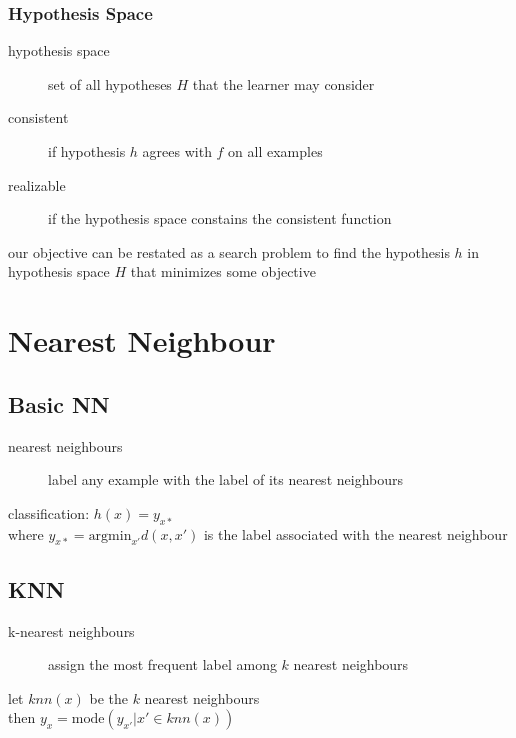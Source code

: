 \documentclass[]{article}
\theoremstyle{definition}
\begin{document}
	\subsubsection{Hypothesis Space}
	\begin{description}
		\item[hypothesis space] set of all hypotheses $H$ that the learner may consider
		\item[consistent] if hypothesis $h$ agrees with $f$ on all examples
		\item[realizable] if the hypothesis space constains the consistent function
	\end{description}
	our objective can be restated as a search problem to find the hypothesis $h$ in hypothesis space $H$ that minimizes some objective

	\section{Nearest Neighbour}

	\subsection{Basic NN}
	\begin{description}
		\item[nearest neighbours] label any example with the label of its nearest neighbours
	\end{description}
	classification: $h(x) = y_{x*}$  \\
	where $y_{x*} = \text{argmin}_{x'} d(x, x')$ is the label associated with the nearest neighbour

	\subsection{KNN}
	\begin{description}
		\item[k-nearest neighbours] assign the most frequent label among $k$ nearest neighbours
	\end{description}
	let $knn(x)$ be the $k$ nearest neighbours \\
	then $y_x = \text{mode}({y_{x'}|x' \in knn(x)})$
\end{document}

